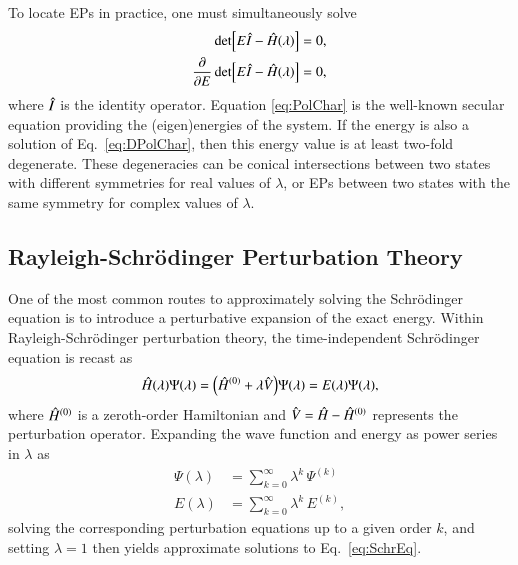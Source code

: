 \documentclass[aps,prb,reprint,noshowkeys,superscriptaddress]{revtex4-1}
\newcommand{\hI}{\Hat{I}}
\newcommand{\hH}{\Hat{H}}
\newcommand{\hV}{\Hat{V}}
\begin{document}
To locate EPs in practice, one must simultaneously solve
\begin{subequations}
\begin{align}
	\label{eq:PolChar}
	\det[E\hI-\hH(\lambda)] & = 0,
	\\ 
	\label{eq:DPolChar}
	\pdv{E}\det[E\hI-\hH(\lambda)] & = 0,
\end{align}
\end{subequations}
where $\hI$ is the identity operator.\cite{Cejnar_2007}
Equation \eqref{eq:PolChar} is the well-known secular equation providing the (eigen)energies of the system. 
If the energy is also a solution of Eq.~\eqref{eq:DPolChar}, then this energy value is at least two-fold degenerate. 
These degeneracies can be conical intersections between two states with different symmetries 
for real values of $\lambda$,\cite{Yarkony_1996} or EPs between two states with the 
same symmetry for complex values of $\lambda$.


\subsection{Rayleigh-Schr\"odinger Perturbation Theory}

One of the most common routes to approximately solving the Schr\"odinger equation
is to introduce a perturbative expansion of the exact energy.
Within Rayleigh-Schr\"odinger perturbation theory, the time-independent Schr\"odinger equation 
is recast as 
\begin{equation} 
	\hH(\lambda) \Psi(\lambda) 
    = \qty(\hH^{(0)} + \lambda \hV ) \Psi(\lambda) 
    = E(\lambda) \Psi(\lambda),
    \label{eq:SchrEq-PT}
\end{equation}
where $\hH^{(0)}$ is a zeroth-order Hamiltonian and $\hV = \hH - \hH^{(0)}$ represents the perturbation operator.
Expanding the wave function and energy as power series in $\lambda$ as 
\begin{subequations}
\begin{align}
    \Psi(\lambda) &= \sum_{k=0}^{\infty} \lambda^{k}\,\Psi^{(k)} 
    \label{eq:psi_expansion}
    \\
    E(\lambda) &= \sum_{k=0}^{\infty} \lambda^{k}\,E^{(k)},
    \label{eq:E_expansion}
\end{align}
\end{subequations}
solving the corresponding perturbation equations up to a given order $k$, and
setting $\lambda = 1$ then yields approximate solutions to Eq.~\eqref{eq:SchrEq}.
\end{document}
